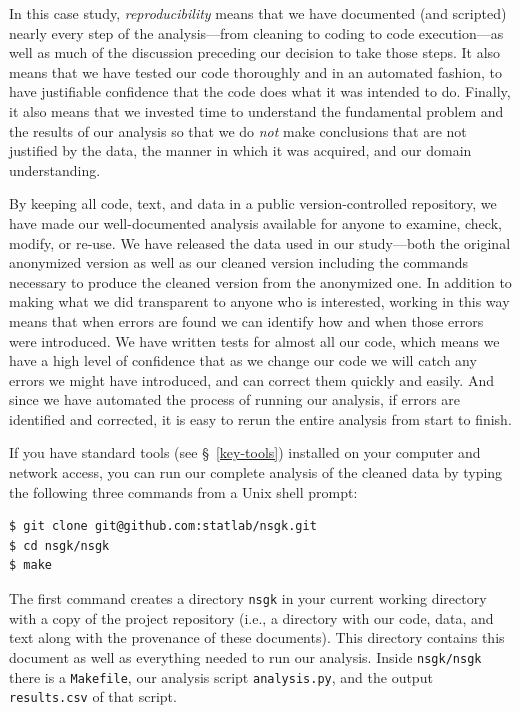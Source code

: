 \documentclass[]{article}
\begin{document}
In this case study, \emph{reproducibility} means that we have documented 
(and scripted) nearly
every step of the analysis---from cleaning to coding to code execution---as
well as much of the discussion preceding our decision to take those steps.
It also means that we have tested our code thoroughly and in an automated fashion, 
to have justifiable confidence that the code does what it was intended
to do.
Finally, it also means that we invested time to understand the fundamental
problem and the results of our analysis so that we do \emph{not} make
conclusions that are not justified by the data, the manner in which it was
acquired, and our domain understanding.

By keeping all code, text, and data in a public version-controlled repository, 
we have made our well-documented analysis available
for anyone to examine, check, modify, or re-use.
We have released the data used in our study---both the original anonymized
version as well as our cleaned version including the commands necessary
to produce the cleaned version from the anonymized one.
In addition to making what we did transparent to anyone who is interested,
working in this way means that when errors are found we can identify
how and when those errors were introduced.
We have written tests for almost all our code, which means we have a high
level of confidence that as we change our code we will catch any errors
we might have introduced, and can correct them quickly and easily.
And since we have automated the process of running our analysis, if errors
are identified and corrected, it is easy to rerun the entire analysis from
start to finish.

If you have standard tools (see \S~\ref{key-tools}) installed on your
computer and network access, you can run our complete analysis of the cleaned
data by typing the following three commands from a Unix shell prompt:
\begin{verbatim}
$ git clone git@github.com:statlab/nsgk.git
$ cd nsgk/nsgk
$ make
\end{verbatim}
The first command creates a directory \texttt{nsgk} in your current working
directory with a copy of the project repository (i.e., a directory with our
code, data, and text along with the provenance of these documents).
This directory contains this document as well as everything needed to run our
analysis.
Inside \texttt{nsgk/nsgk} there is a \texttt{Makefile}, our analysis script
\texttt{analysis.py}, and the output \texttt{results.csv} of that script.
\end{document}
